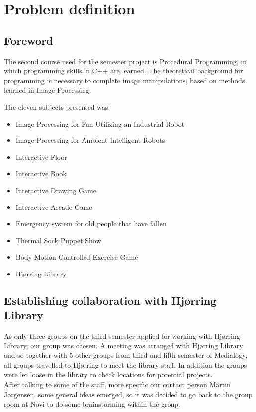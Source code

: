 \chapter{Problem definition}
\section{Foreword}
The second course used for the semester project is Procedural Programming, in which programming skills in C++ are learned. The theoretical background for programming is necessary to complete image manipulations, based on methods learned in Image Processing.

The eleven subjects presented was:

\begin{itemize}
\item Image Processing for Fun Utilizing an Industrial Robot
\item Image Processing for Ambient Intelligent Robots
\item Interactive Floor
\item Interactive Book
\item Interactive Drawing Game
\item Interactive Arcade Game
\item Emergency system for old people that have fallen
\item Thermal Sock Puppet Show
\item Body Motion Controlled Exercise Game
\item Hjørring Library
\end{itemize}

\section{Establishing collaboration with Hjørring Library}

As only three groups on the third semester applied for working with Hjørring Library, our group was chosen. A meeting was arranged with Hjørring Library and so together with 5 other groups from third and fifth semester of Medialogy, all groups travelled to Hjørring to meet the library staff. In addition the groups were let loose in the library to check locations for potential projects.\\
After talking to some of the staff, more specific our contact person Martin Jørgensen, some general ideas emerged, so it was decided to go back to the group room at Novi to do some brainstorming within the group.


